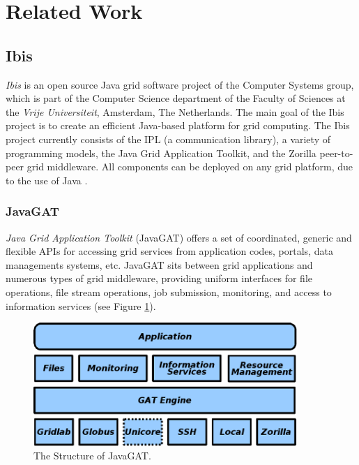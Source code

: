 \section{Related Work}
\label{related}

\subsection{Ibis}
\label{related-ibis}
\emph{Ibis} is an open source Java grid software project of the Computer Systems
group, which is part of the Computer Science department of the Faculty of
Sciences at the \emph{Vrije Universiteit}, Amsterdam, The Netherlands. The main
goal of the Ibis project is to create an efficient Java-based platform for grid
computing. The Ibis project currently consists of the IPL (a communication
library), a variety of programming models, the Java Grid Application Toolkit, and
the Zorilla peer-to-peer grid middleware. All components can be deployed on any
grid platform, due to the use of Java \cite{ibis-www}.

\subsubsection{JavaGAT}
\emph{Java Grid Application Toolkit} (JavaGAT) offers a set of coordinated,
generic and flexible APIs for accessing grid services from application codes,
portals, data managements systems, etc. \cite{javagat-www} JavaGAT sits between
grid applications and numerous types of grid middleware, providing uniform
interfaces for file operations, file stream operations, job submission,
monitoring, and access to information services (see Figure
\ref{related-gat-design}).

\begin{figure}[ht] %
\begin{center}
\includegraphics[width=10cm]{./figures/gat-design.png} 
\caption{The Structure of JavaGAT.\label{related-gat-design}}
\end{center}
\end{figure}

